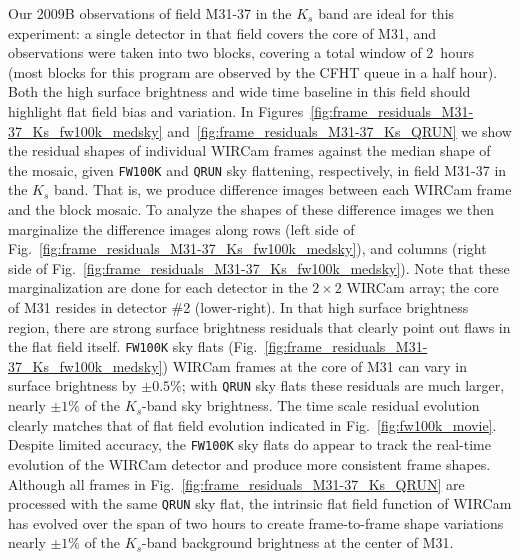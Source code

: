 \documentclass[iop]{emulateapj}
\newcommand{\Fig}[1]{Fig.~\ref{fig:#1}}  %
\begin{document}
Our 2009B observations of field M31-37 in the $K_s$ band are ideal for this experiment: a single detector in that field covers the core of M31, and observations were taken into two blocks, covering a total window of 2~hours (most blocks for this program are observed by the CFHT queue in a half hour).
Both the high surface brightness and wide time baseline in this field should highlight flat field bias and variation.
In Figures~\ref{fig:frame_residuals_M31-37_Ks_fw100k_medsky} and~\ref{fig:frame_residuals_M31-37_Ks_QRUN} we show the residual shapes of individual WIRCam frames against the median shape of the mosaic, given \texttt{FW100K} and \texttt{QRUN} sky flattening, respectively, in field M31-37 in the $K_s$ band.
That is, we produce difference images between each WIRCam frame and the block mosaic.
To analyze the shapes of these difference images we then marginalize the difference images along rows (left side of \Fig{frame_residuals_M31-37_Ks_fw100k_medsky}), and columns (right side of \Fig{frame_residuals_M31-37_Ks_fw100k_medsky}).
Note that these marginalization are done for each detector in the $2\times2$ WIRCam array; the core of M31 resides in detector \#2 (lower-right).
In that high surface brightness region, there are strong surface brightness residuals that clearly point out flaws in the flat field itself.
\texttt{FW100K} sky flats (\Fig{frame_residuals_M31-37_Ks_fw100k_medsky}) WIRCam frames at the core of M31 can vary in surface brightness by $\pm 0.5\%$; with \texttt{QRUN} sky flats these residuals are much larger, nearly $\pm 1\%$ of the $K_s$-band sky brightness.
The time scale residual evolution clearly matches that of flat field evolution indicated in \Fig{fw100k_movie}.
Despite limited accuracy, the \texttt{FW100K} sky flats do appear to track the real-time evolution of the WIRCam detector and produce more consistent frame shapes.
Although all frames in \Fig{frame_residuals_M31-37_Ks_QRUN} are processed with the same \texttt{QRUN} sky flat, the intrinsic flat field function of WIRCam has evolved over the span of two hours to create frame-to-frame shape variations nearly $\pm 1\%$ of the $K_s$-band background brightness at the center of M31.
\end{document}
